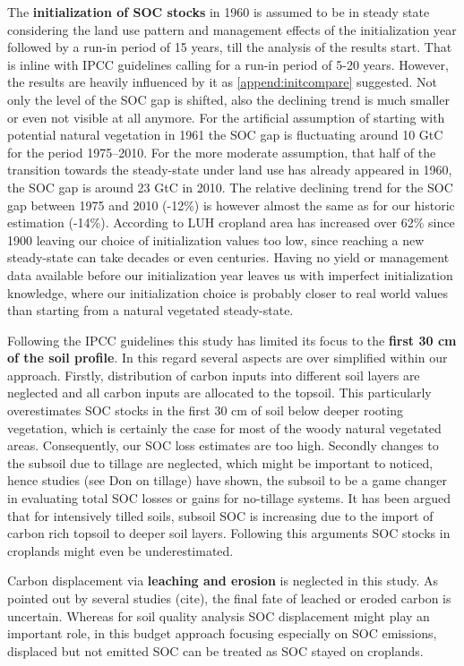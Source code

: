 \documentclass[gc, manuscript]{copernicus}
\begin{document}
The \textbf{initialization of SOC stocks} in 1960 is assumed to be in steady state considering the land use pattern and management effects of the initialization year followed by a run-in period of 15 years, till the analysis of the results start. That is inline with IPCC guidelines calling for a run-in period of 5-20 years. However, the results are heavily influenced by it as \ref{append:initcompare} suggested. Not only the level of the SOC gap is shifted, also the declining trend is much smaller or even not visible at all anymore. For the artificial assumption of starting with potential natural vegetation in 1961 the SOC gap is fluctuating around 10 GtC for the period 1975--2010. For the more moderate assumption, that half of the transition towards the steady-state under land use has already appeared in 1960, the SOC gap is around 23 GtC in 2010. The relative declining trend for the SOC gap between 1975 and 2010 (-12\%) is however almost the same as for our historic estimation (-14\%). According to LUH \citep{hurtt_harmonization_2020} cropland area has increased over 62\% since 1900 leaving our choice of initialization values too low, since reaching a new steady-state can take decades or even centuries. Having no yield or management data available before our initialization year leaves us with imperfect initialization knowledge, where our initialization choice is probably closer to real world values than starting from a natural vegetated steady-state.

Following the IPCC guidelines this study has limited its focus to the \textbf{first 30 cm of the soil profile}. In this regard several aspects are over simplified within our approach. Firstly, distribution of carbon inputs into different soil layers are neglected and all carbon inputs are allocated to the topsoil. This particularly overestimates SOC stocks in the first 30 cm of soil below deeper rooting vegetation, which is certainly the case for most of the woody natural vegetated areas. Consequently, our SOC loss estimates are too high.
Secondly changes to the subsoil due to tillage are neglected, which might be important to noticed, hence studies (see Don on tillage) have shown, the subsoil to be a game changer in evaluating total SOC losses or gains for no-tillage systems. It has been argued that for intensively tilled soils, subsoil SOC is increasing due to the import of carbon rich topsoil to deeper soil layers. Following this arguments SOC stocks in croplands might even be underestimated.

Carbon displacement via \textbf{leaching and erosion} is neglected in this study. As pointed out by several studies (cite), the final fate of leached or eroded carbon is uncertain. Whereas for soil quality analysis SOC displacement might play an important role, in this budget approach focusing especially on SOC emissions, displaced but not emitted SOC can be treated as SOC stayed on croplands.
\newpage
\end{document}
